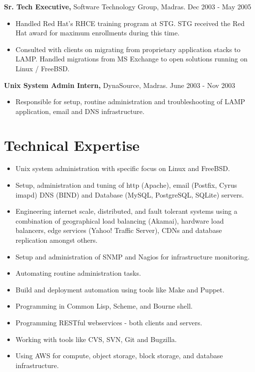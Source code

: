 \documentclass[margin]{res}
\begin{document}
\begin{resume}
\begin{itemize}
 \end{itemize}

{\bf Sr. Tech Executive,} Software Technology Group, Madras. \hfill Dec 2003 - May 2005
 \begin{itemize} \itemsep -2pt
 \item Handled Red Hat's RHCE training program at STG. STG received the Red Hat
   award for maximum enrollments during this time.
 \item Consulted with clients on migrating from proprietary application stacks
   to LAMP. Handled migrations from MS Exchange to open solutions running on 
   Linux / FreeBSD.
   
 \end{itemize}

{\bf Unix System Admin Intern,} DynaSource, Madras. \hfill June 2003 - Nov 2003
 \begin{itemize} \itemsep -2pt
 \item Responsible for setup, routine administration and troubleshooting 
   of LAMP \\ application, email and DNS infrastructure.
   
 \end{itemize}

\section{Technical Expertise} 
 \begin{itemize} \itemsep -2pt
 \item Unix system administration with specific focus on Linux and FreeBSD.
 \item Setup, administration and tuning of http (Apache), email (Postfix, Cyrus imapd)
   DNS (BIND) and Database (MySQL, PostgreSQL, SQLite) servers.
 \item Engineering internet scale, distributed, and fault tolerant systems 
   using a \\ combination of geographical load balancing (Akamai), hardware load 
   balancers, edge services (Yahoo! Traffic Server), CDNs  and database replication 
   amongst others.
 \item Setup and administration of SNMP and Nagios for infrastructure monitoring.
 \item Automating routine administration tasks.
 \item Build and deployment automation using tools like Make and Puppet.
 \item Programming in Common Lisp, Scheme, and Bourne shell.
 \item Programming RESTful webservices - both clients and servers.
 \item Working with tools like CVS, SVN, Git and Bugzilla.
 \item Using AWS for compute, object storage, block storage, and database \\ 
   infrastructure.


\end{itemize}
\end{resume}
\end{document}
